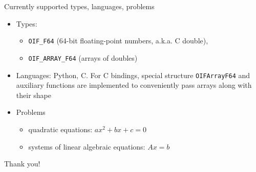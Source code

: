 \documentclass[10pt, aspectratio=169, progressbar=frametitle]{beamer}
\begin{document}
\begin{frame}{Currently supported types, languages, problems}
  \begin{itemize}
    \item Types:
      \begin{itemize}
        \item \texttt{OIF\_F64} (64-bit floating-point numbers, a.k.a. C double),
        \item \texttt{OIF\_ARRAY\_F64} (arrays of doubles)
      \end{itemize}
    \item Languages: Python, C. For C bindings, special structure \texttt{OIFArrayF64} and auxiliary
      functions are implemented to conveniently pass arrays
      along with their shape
    \item Problems
      \begin{itemize}
        \item quadratic equations: $ax^2 + bx + c = 0$
        \item systems of linear algebraic equations: $Ax = b$
      \end{itemize}
  \end{itemize}
\end{frame}

\begin{frame}[standout]
  \centering
  \Huge
  Thank you!
\end{frame}
\end{document}
